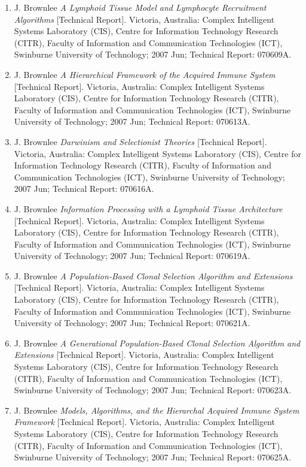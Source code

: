 \begin{enumerate}
	\item J. Brownlee \emph{A Lymphoid Tissue Model and Lymphocyte Recruitment Algorithms} [Technical Report]. Victoria, Australia: Complex Intelligent Systems Laboratory (CIS), Centre for Information Technology Research (CITR), Faculty of Information and Communication Technologies (ICT), Swinburne University of Technology; 2007 Jun; Technical Report: 070609A.
	\item J. Brownlee \emph{A Hierarchical Framework of the Acquired Immune System} [Technical Report]. Victoria, Australia: Complex Intelligent Systems Laboratory (CIS), Centre for Information Technology Research (CITR), Faculty of Information and Communication Technologies (ICT), Swinburne University of Technology; 2007 Jun; Technical Report: 070613A.
	\item J. Brownlee \emph{Darwinism and Selectionist Theories} [Technical Report]. Victoria, Australia: Complex Intelligent Systems Laboratory (CIS), Centre for Information Technology Research (CITR), Faculty of Information and Communication Technologies (ICT), Swinburne University of Technology; 2007 Jun; Technical Report: 070616A.
	\item J. Brownlee \emph{Information Processing with a Lymphoid Tissue Architecture} [Technical Report]. Victoria, Australia: Complex Intelligent Systems Laboratory (CIS), Centre for Information Technology Research (CITR), Faculty of Information and Communication Technologies (ICT), Swinburne University of Technology; 2007 Jun; Technical Report: 070619A.
	\item J. Brownlee \emph{A Population-Based Clonal Selection Algorithm and Extensions} [Technical Report]. Victoria, Australia: Complex Intelligent Systems Laboratory (CIS), Centre for Information Technology Research (CITR), Faculty of Information and Communication Technologies (ICT), Swinburne University of Technology; 2007 Jun; Technical Report: 070621A.
	\item J. Brownlee \emph{A Generational Population-Based Clonal Selection Algorithm and Extensions} [Technical Report]. Victoria, Australia: Complex Intelligent Systems Laboratory (CIS), Centre for Information Technology Research (CITR), Faculty of Information and Communication Technologies (ICT), Swinburne University of Technology; 2007 Jun; Technical Report: 070623A.
	\item J. Brownlee \emph{Models, Algorithms, and the Hierarchal Acquired Immune System Framework} [Technical Report]. Victoria, Australia: Complex Intelligent Systems Laboratory (CIS), Centre for Information Technology Research (CITR), Faculty of Information and Communication Technologies (ICT), Swinburne University of Technology; 2007 Jun; Technical Report: 070625A.

\end{enumerate}
